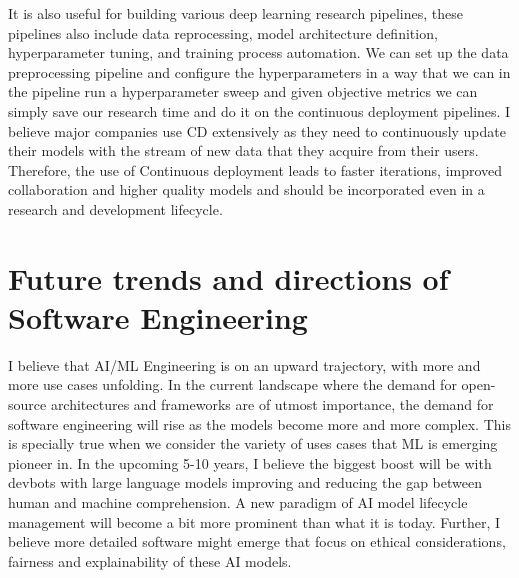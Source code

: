 \documentclass[11pt]{article}
\begin{document}
It is also useful for building various deep learning research pipelines, these pipelines also include data reprocessing, model architecture definition, hyperparameter tuning, and training process automation. We can set up the data preprocessing pipeline and configure the hyperparameters in a way that we can in the pipeline run a hyperparameter sweep and given objective metrics we can simply save our research time and do it on the continuous deployment pipelines. 
I believe major companies use CD extensively as they need to continuously update their models with the stream of new data that they acquire from their users. Therefore, the use of Continuous deployment leads to faster iterations, improved collaboration and higher quality models and should be incorporated even in a research and development lifecycle.

\section*{Future trends and directions of Software Engineering}
I believe that AI/ML Engineering is on an upward trajectory, with more and more use cases unfolding. In the current landscape where the demand for open-source  architectures and frameworks are of utmost importance, the demand for software engineering will rise as the models become more and more complex. This is specially true when we consider the variety of uses cases that ML is emerging pioneer in. In the upcoming 5-10 years, I believe the biggest boost will be with devbots with large language models improving and reducing the gap between human and machine comprehension. A new paradigm of AI model lifecycle management will become a bit more prominent than what it is today. Further, I believe more detailed software might emerge that focus on ethical considerations, fairness and explainability of these AI models.

\printbibliography
\end{document}
